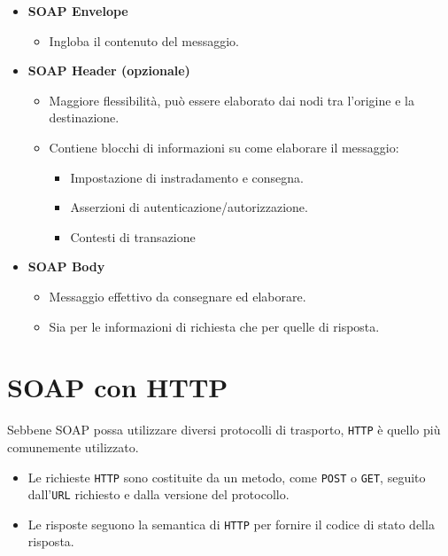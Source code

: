 \begin{itemize}
    \item \textbf{SOAP Envelope}
        \begin{itemize}
            \item Ingloba il contenuto del messaggio.
        \end{itemize}
    \item \textbf{SOAP Header (opzionale)}
        \begin{itemize}
            \item Maggiore flessibilità, può essere elaborato dai nodi tra l'origine e la destinazione.
            \item Contiene blocchi di informazioni su come elaborare il messaggio:
            
            \begin{itemize}
                \item Impostazione di instradamento e consegna.
                \item Asserzioni di autenticazione/autorizzazione.
                \item Contesti di transazione
            \end{itemize}
        \end{itemize}
    \item \textbf{SOAP Body}
        \begin{itemize}
            \item Messaggio effettivo da consegnare ed elaborare.
            \item Sia per le informazioni di richiesta che per quelle di risposta.
        \end{itemize}
\end{itemize}

\section{SOAP con HTTP}
Sebbene SOAP possa utilizzare diversi protocolli di trasporto, \texttt{HTTP} è quello più comunemente utilizzato.

\begin{itemize}
    \item Le richieste \texttt{HTTP} sono costituite da un metodo, come \texttt{POST} o \texttt{GET}, seguito dall'\texttt{URL} richiesto e dalla versione del protocollo.
    \item Le risposte seguono la semantica di \texttt{HTTP} per fornire il codice di stato della risposta.
\end{itemize}

